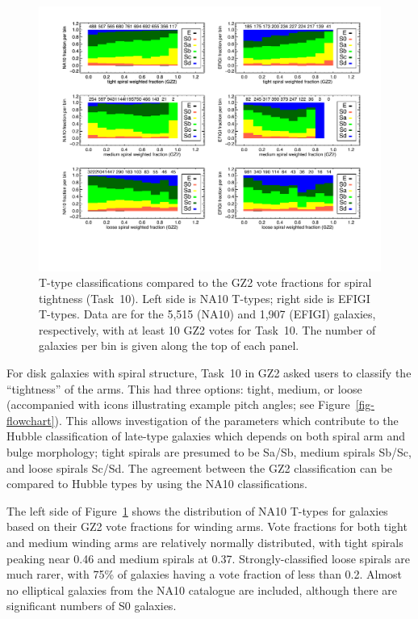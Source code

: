 \documentclass[useAMS,usenatbib]{mn2e}
\begin{document}
\begin{figure}
\includegraphics[angle=0,width=7.0in]{figures/spiraltightness_color.pdf}
\caption{T-type classifications compared to the GZ2 vote fractions for spiral tightness (Task~10). Left side is NA10 T-types; right side is EFIGI T-types. Data are for the 5,515 (NA10) and 1,907 (EFIGI) galaxies, respectively, with at least 10 GZ2 votes for Task~10. The number of galaxies per bin is given along the top of each panel. 
\label{fig-spiraltightness}}
\end{figure}

For disk galaxies with spiral structure, Task~10 in GZ2 asked users to classify the ``tightness'' of the arms. This had three options: tight, medium, or loose (accompanied with icons illustrating example pitch angles; see Figure~\ref{fig-flowchart}). This allows investigation of the parameters which contribute to the Hubble classification of late-type galaxies which depends on both spiral arm and bulge morphology; tight spirals are presumed to be Sa/Sb, medium spirals Sb/Sc, and loose spirals Sc/Sd. The agreement between the GZ2 classification can be compared to Hubble types by using the NA10 classifications. 

The left side of Figure~\ref{fig-spiraltightness} shows the distribution of NA10 T-types for galaxies based on their GZ2 vote fractions for winding arms. Vote fractions for both tight and medium winding arms are relatively normally distributed, with tight spirals peaking near 0.46 and medium spirals at 0.37. Strongly-classified loose spirals are much rarer, with 75\% of galaxies having a vote fraction of less than 0.2. Almost no elliptical galaxies from the NA10 catalogue are included, although there are significant numbers of S0 galaxies. 
\end{document}
